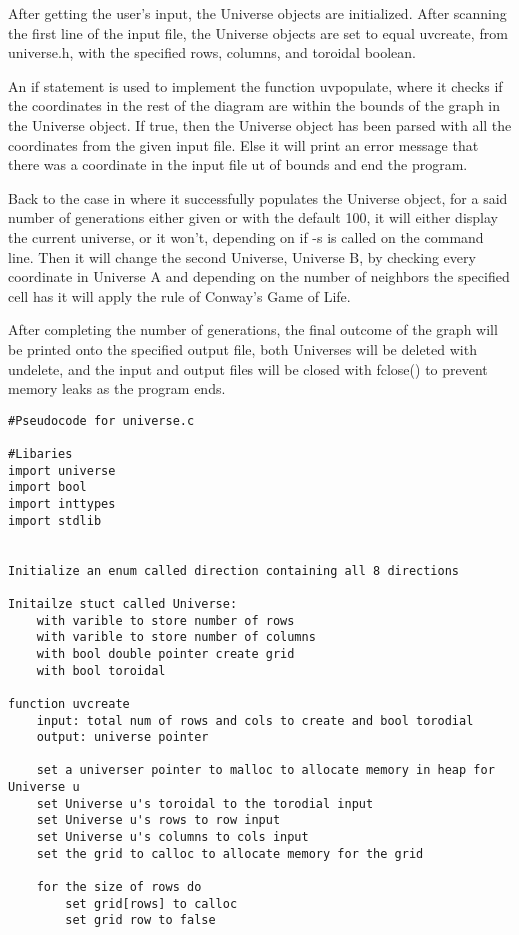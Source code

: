 \documentclass[11pt]{article} %
\begin{document}
\begin{flushleft}
After getting the user’s input, the Universe objects are initialized. After scanning the first line of the input file, the Universe objects are set to equal uvcreate, from universe.h, with the specified rows, columns, and toroidal boolean.

An if statement is used to implement the function uvpopulate, where it checks if the coordinates in the rest of the diagram are within the bounds of the graph in the  Universe object.
If true, then the Universe object has been parsed with all the coordinates from the given input file. Else it will print an error message that there was a coordinate in the input file ut of bounds and end the program.

Back to the case in where it successfully populates the Universe object, for a said number of generations either given or with the default 100, it will either display the current universe, or it won’t, depending on if -s is called on the command line. Then it will change the second Universe, Universe B, by checking every coordinate in Universe A and depending on the number of neighbors the specified cell has it will apply the rule of Conway’s Game of Life. 

After completing the number of generations, the final outcome of the graph will be printed onto the specified output file, both Universes will be deleted with undelete, and the input and output files will be closed with fclose() to prevent memory leaks as the program ends.


\begin{lstlisting}
#Pseudocode for universe.c

#Libaries
import universe
import bool
import inttypes
import stdlib


Initialize an enum called direction containing all 8 directions

Initailze stuct called Universe:
    with varible to store number of rows
    with varible to store number of columns
    with bool double pointer create grid
    with bool toroidal

function uvcreate
    input: total num of rows and cols to create and bool torodial
    output: universe pointer

    set a universer pointer to malloc to allocate memory in heap for Universe u
    set Universe u's toroidal to the torodial input
    set Universe u's rows to row input
    set Universe u's columns to cols input
    set the grid to calloc to allocate memory for the grid

    for the size of rows do
        set grid[rows] to calloc
        set grid row to false


\end{lstlisting}
\end{flushleft}
\end{document}
